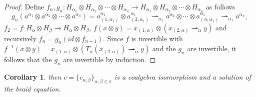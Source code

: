 \documentclass[11pt]{article}
\def\a{\alpha}
\def\b{\beta}
\def\o{\otimes}
\newtheorem{corollary}[theorem]{Corollary}
\begin{document}
\begin{proof}
Define $f_n,g_n:H_{\a_1}\o H_{\a_2}\o\cdots\o H_{\a_n}\rightarrow H_{\a_1}\o H_{\a_2}\o\cdots\o H_{\a_n}$ as follows
$$g_n(a^{\a_1}\o a^{\a_2}\o\cdots\o a^{\a_n})=a^{\a_1}_{(1,\a_1)}\o a^{\a_1}_{(2,\a_1)}\rightharpoonup_{\a_1}a^{\a_2}\o\cdots\o a^{\a_1}_{(n,\a_1)}\rightharpoonup_{\a_1}a^{\a_n},$$
$f_2=f:H_\a\o H_\b\rightarrow H_\a\o H_\b$, $f(x\o y)=x_{(1,\a)}\o (x_{(2,\a)}\rightharpoonup_\a y)$ and recursively $f_n=g_n(id\o f_{n-1})$. Since $f$ is invertible with $f^{-1}(x\o y)=x_{(1,\a)}\o (T_\a(x_{(2,\a)})\rightharpoonup_{\bar{\a}}y)$ and the $g_n$ are invertible, it follows that the $g_n$ are invertible by induction.
\end{proof}

\begin{corollary}
then $c=\{c_{\a,\b}\}_{\a,\b\in\pi}$ is a coalgebra isomorphism and a solution of the braid equation.
\end{corollary}
\end{document}
